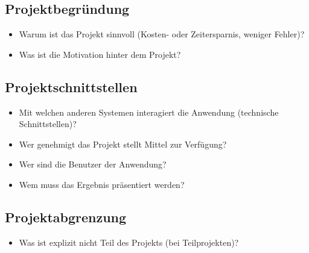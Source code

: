 \subsection{Projektbegründung} 
\label{sec:Projektbegruendung}
\begin{itemize}
	\item Warum ist das Projekt sinnvoll (\zB Kosten- oder Zeitersparnis, weniger Fehler)?
	\item Was ist die Motivation hinter dem Projekt?
\end{itemize}


\subsection{Projektschnittstellen} 
\label{sec:Projektschnittstellen}
\begin{itemize}
	\item Mit welchen anderen Systemen interagiert die Anwendung (technische Schnittstellen)?
	\item Wer genehmigt das Projekt \bzw stellt Mittel zur Verfügung? 
	\item Wer sind die Benutzer der Anwendung?
	\item Wem muss das Ergebnis präsentiert werden?
\end{itemize}


\subsection{Projektabgrenzung} 
\label{sec:Projektabgrenzung}
\begin{itemize}
	\item Was ist explizit nicht Teil des Projekts (\insb bei Teilprojekten)?
\end{itemize}
